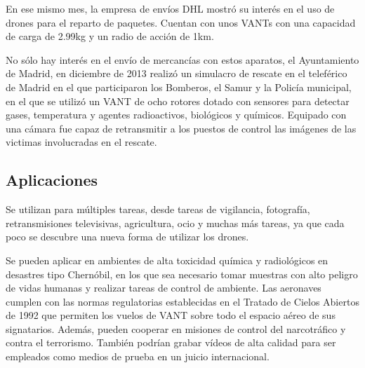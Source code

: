 En ese mismo mes, la empresa de envíos DHL mostró su interés en el uso de drones para el reparto de paquetes. Cuentan con unos VANTs con una capacidad de carga de 2.99kg y un radio de acción de 1km. 

No sólo hay interés en el envío de mercancías con estos aparatos, el Ayuntamiento de Madrid, en diciembre de 2013 realizó un simulacro de rescate en el teleférico de Madrid en el que participaron los Bomberos, el Samur y la Policía municipal, en el que se utilizó un VANT de ocho rotores dotado con sensores para detectar gases, temperatura y agentes radioactivos, biológicos y químicos. Equipado con una cámara fue capaz de retransmitir a los puestos de control las imágenes de las victimas involucradas en el rescate.

\subsection{Aplicaciones}
\label{sec:aplicaciones}

Se utilizan para múltiples tareas, desde tareas de vigilancia, fotografía, retransmisiones televisivas, agricultura, ocio y muchas más tareas, ya que cada poco se descubre una nueva forma de utilizar los drones.

Se pueden aplicar en ambientes de alta toxicidad química y radiológicos en desastres tipo Chernóbil, en los que sea necesario tomar muestras con alto peligro de vidas humanas y realizar tareas de control de ambiente. Las aeronaves cumplen con las normas regulatorias establecidas en el Tratado de Cielos Abiertos de 1992 que permiten los vuelos de VANT sobre todo el espacio aéreo de sus signatarios. Además, pueden cooperar en misiones de control del narcotráfico y contra el terrorismo. También podrían grabar vídeos de alta calidad para ser empleados como medios de prueba en un juicio internacional.

